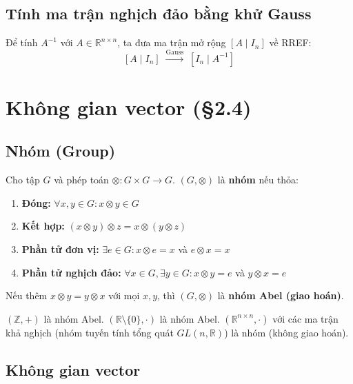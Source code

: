 \documentclass[12pt,a4paper]{article}
\begin{document}
\subsection{Tính ma trận nghịch đảo bằng khử Gauss}

Để tính $A^{-1}$ với $A \in \mathbb{R}^{n \times n}$, ta đưa ma trận mở rộng $[A \mid I_n]$ về RREF:
\[
  [A \mid I_n] \;\xrightarrow{\text{Gauss}}\; [I_n \mid A^{-1}]
\]

\section{Không gian vector (§2.4)}

\subsection{Nhóm (Group)}

\begin{dinhnghia}
Cho tập $G$ và phép toán $\otimes : G \times G \to G$. $(G, \otimes)$ là \textbf{nhóm} nếu thỏa:
\begin{enumerate}
  \item \textbf{Đóng:} $\forall x, y \in G: x \otimes y \in G$
  \item \textbf{Kết hợp:} $(x \otimes y) \otimes z = x \otimes (y \otimes z)$
  \item \textbf{Phần tử đơn vị:} $\exists e \in G: x \otimes e = x$ và $e \otimes x = x$
  \item \textbf{Phần tử nghịch đảo:} $\forall x \in G, \exists y \in G: x \otimes y = e$ và $y \otimes x = e$
\end{enumerate}
Nếu thêm $x \otimes y = y \otimes x$ với mọi $x, y$, thì $(G, \otimes)$ là \textbf{nhóm Abel (giao hoán)}.
\end{dinhnghia}

\begin{vidu}
$(\mathbb{Z}, +)$ là nhóm Abel. $(\mathbb{R} \setminus \{0\}, \cdot)$ là nhóm Abel. $(\mathbb{R}^{n \times n}, \cdot)$ với các ma trận khả nghịch (nhóm tuyến tính tổng quát $GL(n, \mathbb{R})$) là nhóm (không giao hoán).
\end{vidu}

\subsection{Không gian vector}
\end{document}
